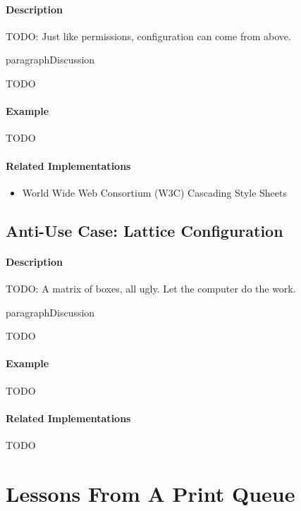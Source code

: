 \paragraph{Description}

{\Large TODO:} Just like permissions, configuration can come from above.

paragraph{Discussion}

{\Large TODO}

\paragraph{Example}

{\Large TODO}

\paragraph{Related Implementations}

\begin{itemize}
	\item World Wide Web Consortium (W3C) Cascading Style Sheets
\end{itemize}

\subsection{Anti-Use Case: Lattice Configuration}

\paragraph{Description}

{\Large TODO:} A matrix of boxes, all ugly.  Let the computer do the work.

paragraph{Discussion}

{\Large TODO}

\paragraph{Example}

{\Large TODO}

\paragraph{Related Implementations}

{\Large TODO}

\section{Lessons From A Print Queue}

